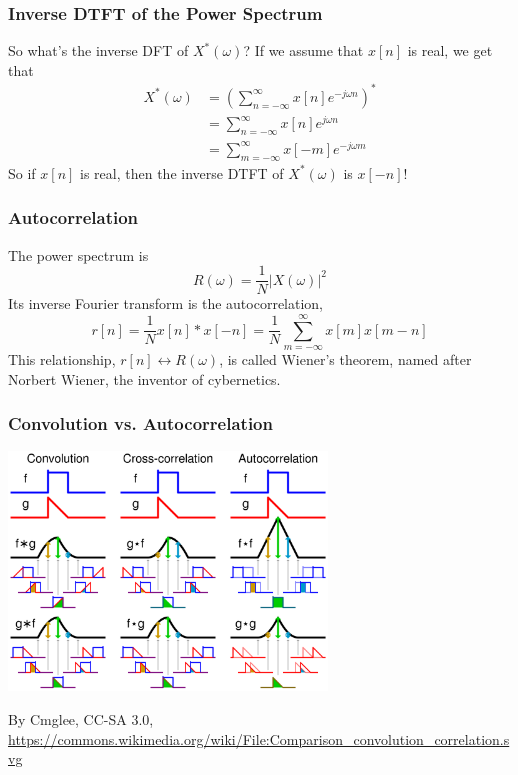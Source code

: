 \documentclass{beamer}
\begin{document}
\begin{frame}
  \frametitle{Inverse DTFT of the Power Spectrum}

  So what's the inverse DFT of $X^*(\omega)$?  If we assume that $x[n]$ is
  real, we get that
  \begin{align*}
    X^*(\omega) &= \left(\sum_{n=-\infty}^{\infty}x[n]e^{-j\omega n}\right)^*\\
    &= \sum_{n=-\infty}^{\infty}x[n]e^{j\omega n}\\
    &= \sum_{m=-\infty}^{\infty}x[-m]e^{-j\omega m}
  \end{align*}
  So if $x[n]$ is real, then the inverse DTFT of $X^*(\omega)$ is $x[-n]$!
\end{frame}
\begin{frame}
  \frametitle{Autocorrelation}
  The power spectrum is
  \[
  R(\omega)=\frac{1}{N}|X(\omega)|^2
  \]
  Its inverse Fourier transform is the autocorrelation,
  \[
  r[n] = \frac{1}{N}x[n]\ast x[-n]  = \frac{1}{N}\sum_{m=-\infty}^\infty  x[m] x[m-n]
  \]
  This relationship, $r[n]\leftrightarrow R(\omega)$, is called
  Wiener's theorem, named after Norbert Wiener, the inventor of
  cybernetics.
\end{frame}

\begin{frame}
  \frametitle{Convolution vs. Autocorrelation}
  \centerline{\includegraphics[height=2.5in]{Comparison_convolution_correlation.png}}
  \begin{tiny}
    By Cmglee, CC-SA 3.0,
    \url{https://commons.wikimedia.org/wiki/File:Comparison_convolution_correlation.svg}
  \end{tiny}
\end{frame}
\end{document}
